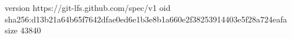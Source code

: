 version https://git-lfs.github.com/spec/v1
oid sha256:d13b21a64b65f7642dfae0ed6e1b3e8b1a660e2f38253914403e5f28a724eafa
size 43840
